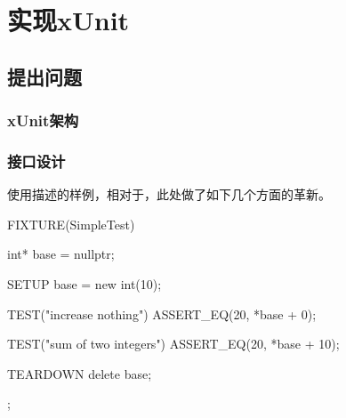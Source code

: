 \begin{savequote}[45mm]
\end{savequote}

\chapter{实现xUnit} 
\label{ch:ice-breaker}

\begin{content}

\end{content}

\section{提出问题}
	
\begin{content}

\subsection{xUnit架构}

\subsection{接口设计}

使用描述的样例，相对于，此处做了如下几个方面的革新。

\begin{enum}
\end{enum}


\begin{leftbar}
 \begin{c++}
FIXTURE(SimpleTest) {
  int* base = nullptr;   

  SETUP {
    base = new int(10);
  }

  TEST("increase nothing") {
    ASSERT_EQ(20, *base + 0);
  }
  
  TEST("sum of two integers") {
    ASSERT_EQ(20, *base + 10);
  }
 
  TEARDOWN {
    delete base;
  }
}; 
 \end{c++}
\end{leftbar}

\end{content}

